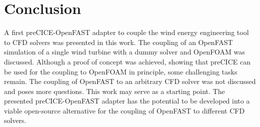 \section{Conclusion}
\label{section:conclusion}

A first preCICE-OpenFAST adapter to couple the wind energy engineering tool to CFD solvers was presented in this work. The coupling of an OpenFAST simulation of a single wind turbine with a dummy solver and OpenFOAM was discussed. Although a proof of concept was achieved, showing that preCICE can be used for the coupling to OpenFOAM in principle, some challenging tasks remain. The coupling of OpenFAST to an arbitrary CFD solver was not discussed and poses more questions. This work may serve as a starting point. The presented preCICE-OpenFAST adapter has the potential to be developed into a viable open-source alternative for the coupling of OpenFAST to different CFD solvers.

\begin{comment}
\begin{itemize}
\item First coupling of OpenFAST and preCICE was presented
\item Coupling with a dummy solver and OpenFOAM was discussed
\item Although a proof of concept was achieved, some challenging tasks remain to enable a full coupling to CFD solvers
\item How to map between OpenFAST and an arbitrary CFD solver? Where to place the mapping and smearing algorithm for the ALM method?
\item This work may serve as a starting point
\item Has the potential to be developed into a viable open-source alternative for the coupling of OpenFAST to different CFD solvers
\end{itemize}
\end{comment}


